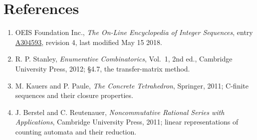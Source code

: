 \documentclass[11pt]{article}
\theoremstyle{definition}
\begin{document}
\section{References}

\begin{enumerate}

\item OEIS Foundation Inc., \emph{The On-Line Encyclopedia of Integer Sequences}, entry \href{https://oeis.org/A304593}{A304593}, revision 4, last modified May 15 2018.

\item R. P. Stanley, \emph{Enumerative Combinatorics}, Vol.~1, 2nd ed., Cambridge University Press, 2012; \S4.7, the transfer-matrix method.

\item M. Kauers and P. Paule, \emph{The Concrete Tetrahedron}, Springer, 2011; C-finite sequences and their closure properties.

\item J. Berstel and C. Reutenauer, \emph{Noncommutative Rational Series with Applications}, Cambridge University Press, 2011; linear representations of counting automata and their reduction.

\end{enumerate}
\end{document}
